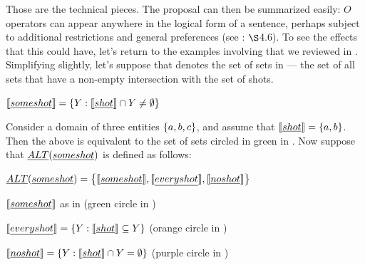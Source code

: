 \documentclass[leqno]{article}
\begin{document}
Those are the technical pieces. The proposal can then be summarized
easily: $O$ operators can appear anywhere in the logical form of a
sentence, perhaps subject to additional restrictions and general
preferences (see \CFS: $\S$4.6). To see the effects that this could
have, let's return to the examples involving  that we
reviewed in . Simplifying slightly, let's
suppose that  denotes the set of sets in 
--- the set of all sets that have a non-empty intersection with the
set of shots.
%
\begin{examples}
\item\label{someshot} $\llbracket\emph{some shot}\rrbracket = \left\{ Y : \llbracket\emph{shot}\rrbracket \cap Y \neq \emptyset \right\}$
\end{examples}
%
Consider a domain of three entities $\left\{ a,b,c \right\}$, and assume that
$\llbracket\emph{shot}\rrbracket = \left\{ a,b \right\}$. Then the above is equivalent to the
set of sets circled in green in . Now suppose that
$\emph{ALT}(\emph{some shot})$ is defined as follows:
%
\begin{examples}
\item\label{altsome} $\emph{ALT}(\emph{some shot}) =  
  \left\{ 
    \llbracket\emph{some shot}\rrbracket, 
    \llbracket\emph{every shot}\rrbracket, 
    \llbracket\emph{no shot}\rrbracket
   \right\}$
  \begin{examples}
  \item $\llbracket\emph{some shot}\rrbracket$ as in  \hfill (green circle in )
  \item $\llbracket\emph{every shot}\rrbracket = \left\{ Y : \llbracket\emph{shot}\rrbracket \subseteq Y \right\}$ \hfill (orange circle in )
  \item $\llbracket\emph{no shot}\rrbracket = \left\{ Y : \llbracket\emph{shot}\rrbracket \cap Y = \emptyset \right\}$  \hfill (purple circle in )
  \end{examples}
\end{examples}
\end{document}
